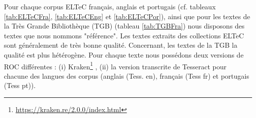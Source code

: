 Pour chaque corpus ELTeC français, anglais et portugais (cf. tableaux \ref{tab:ELTeCFra}, \ref{tab:ELTeCEng} et \ref{tab:ELTeCPor}), ainsi que pour les textes de la Très Grande Bibliothèque (TGB) (tableau \ref{tab:TGBFra}) nous disposons des textes que nous nommons "référence". Les textes extraits des collections ELTeC sont généralement de très bonne qualité. Concernant, les textes de la TGB la qualité est plus hétérogène. Pour chaque texte nous possédons deux versions de ROC différentes : (i) Kraken\footnote{\url{https://kraken.re/2.0.0/index.html}} \cite{kiessling2019escriptorium}, (ii) la version transcrite de Tesseract pour chacune des langues des corpus (anglais (Tess. en), français (Tess fr) et portugais (Tess pt)).

